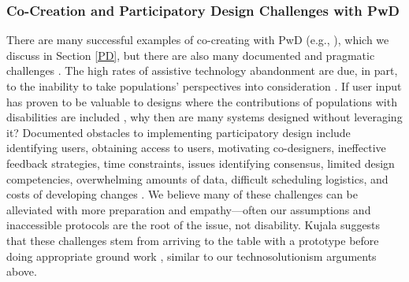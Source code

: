 \subsubsection{Co-Creation and Participatory Design Challenges with PwD} \label{cocreationchallenges}
There are many successful examples of co-creating with PwD (e.g., \cite{anthonyParticipatoryDesignWorkshop2012,assadMotionBasedGamesParkinson2011,bentonDevelopingIDEASSupporting2012,duvalSpokeItBuildingMobile2018,ellisIncreasingUsabilityOnline2000,ellisParticipatoryDesignInternetbased1998,elorImmersiveVirtualReality2018,karnaDesigningTechnologiesChildren2010,gerlingDesigningMovementbasedPlay2016,grafIGYMInteractiveFloor2019,khaledBridgingSeriousGames2014,malinverniParticipatoryDesignStrategies2014,priorHCIMethodsIncluding2010}), which we discuss in Section \ref{PD}, but there are also many documented and pragmatic challenges \cite{wardReflectionsParticipatoryAction2001}. The high rates of assistive technology abandonment are due, in part, to the inability to take populations’ perspectives into consideration \cite{gitlinWHYOLDERPEOPLE1995,phillipsPredictorsAssistiveTechnology1993,vandijkEmpoweringPeopleImpairments2016}. If user input has proven to be valuable to designs where the contributions of populations with disabilities are included \cite{karnaDesigningTechnologiesChildren2010,sampleBeginningsParticipatoryAction1996}, why then are many systems designed without leveraging it? Documented obstacles to implementing participatory design include identifying users, obtaining access to users, motivating co-designers, ineffective feedback strategies, time constraints, issues identifying consensus, limited design competencies, overwhelming amounts of data, difficult scheduling logistics, and costs of developing changes \cite{kujalaUserInvolvementReview2003}. We believe many of these challenges can be alleviated with more preparation and empathy—often our assumptions and inaccessible protocols are the root of the issue, not disability. Kujala suggests that these challenges stem from arriving to the table with a prototype before doing appropriate ground work \cite{kujalaUserInvolvementReview2003}, similar to our technosolutionism arguments above.

